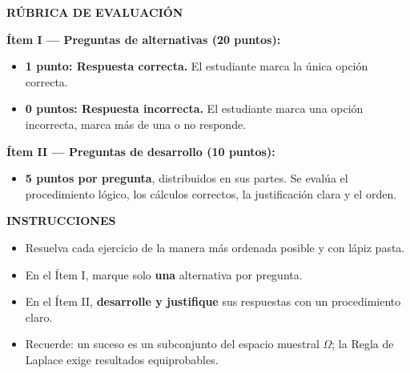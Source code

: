 \documentclass[12pt, a4paper]{article} %
\begin{document}
\noindent
{}

\vspace{0.5cm}
\centerline{\textbf{RÚBRICA DE EVALUACIÓN}}
\vspace{0.4cm}

\textbf{Ítem I — Preguntas de alternativas (20 puntos):}
\begin{itemize}[topsep=2pt, itemsep=1pt]
    \item \textbf{1 punto: Respuesta correcta.} El estudiante marca la única opción correcta.
    \item \textbf{0 puntos: Respuesta incorrecta.} El estudiante marca una opción incorrecta, marca más de una o no responde.
\end{itemize}

\textbf{Ítem II — Preguntas de desarrollo (10 puntos):}
\begin{itemize}[topsep=2pt, itemsep=1pt]
    \item \textbf{5 puntos por pregunta}, distribuidos en sus partes. Se evalúa el procedimiento lógico, los cálculos correctos, la justificación clara y el orden.
\end{itemize}

\vspace{0.4cm}
\centerline{\textbf{INSTRUCCIONES}}
\vspace{0.3cm}

\begin{itemize}[topsep=2pt, itemsep=1pt]
    \item Resuelva cada ejercicio de la manera más ordenada posible y con lápiz pasta.
    \item En el Ítem I, marque solo \textbf{una} alternativa por pregunta.
    \item En el Ítem II, \textbf{desarrolle y justifique} sus respuestas con un procedimiento claro.
    \item Recuerde: un suceso es un subconjunto del espacio muestral $\Omega$; la Regla de Laplace exige resultados equiprobables.
\end{itemize}
\end{document}
